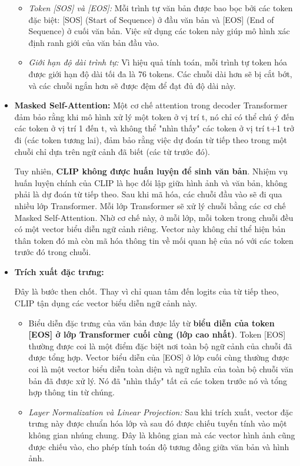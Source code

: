 \begin{itemize}
\begin{itemize}
\item \textit{Token [SOS] và [EOS]:} Mỗi trình tự văn bản được bao bọc bởi các token đặc biệt: [SOS] (Start of Sequence) ở đầu văn bản và [EOS] (End of Sequence) ở cuối văn bản. Việc sử dụng các token này giúp mô hình xác định ranh giới của văn bản đầu vào. 
\item \textit{Giới hạn độ dài trình tự:} Vì hiệu quả tính toán, mỗi trình tự token hóa được giới hạn độ dài tối đa là 76 tokens. Các chuỗi dài hơn sẽ bị cắt bớt, và các chuỗi ngắn hơn sẽ được đệm để đạt đủ độ dài này.
\end{itemize}
\item \textbf{Masked Self-Attention:} Một cơ chế attention trong decoder Transformer đảm bảo rằng khi mô hình xử lý một token ở vị trí t, nó chỉ có thể chú ý đến các token ở vị trí 1 đến t, và không thể "nhìn thấy" các token ở vị trí t+1 trở đi (các token tương lai), đảm bảo rằng việc dự đoán từ tiếp theo trong một chuỗi chỉ dựa trên ngữ cảnh đã biết (các từ trước đó). 

Tuy nhiên, \textbf{CLIP không được huấn luyện để sinh văn bản}. Nhiệm vụ huấn luyện chính của CLIP là học đối lập giữa hình ảnh và văn bản, không phải là dự đoán từ tiếp theo. Sau khi mã hóa, các chuỗi đầu vào sẽ đi qua nhiều lớp Transformer. Mỗi lớp Transformer sẽ xử lý chuỗi bằng các cơ chế Masked Self-Attention. Nhờ cơ chế này, ở mỗi lớp, mỗi token trong chuỗi đều có một vector biểu diễn ngữ cảnh riêng. Vector này không chỉ thể hiện bản thân token đó mà còn mã hóa thông tin về mối quan hệ của nó với các token trước đó trong chuỗi.

\item \textbf{Trích xuất đặc trưng:}

Đây là bước then chốt. Thay vì chỉ quan tâm đến logits của từ tiếp theo, CLIP tận dụng các vector biểu diễn ngữ cảnh này.
\begin{itemize}
\item Biểu diễn đặc trưng của văn bản được lấy từ \textbf{biểu diễn của token [EOS] ở lớp Transformer cuối cùng (lớp cao nhất)}. Token [EOS] thường được coi là một điểm đặc biệt nơi toàn bộ ngữ cảnh của chuỗi đã được tổng hợp. Vector biểu diễn của [EOS] ở lớp cuối cùng thường được coi là một vector biểu diễn toàn diện và ngữ nghĩa của toàn bộ chuỗi văn bản đã được xử lý. Nó đã "nhìn thấy" tất cả các token trước nó và tổng hợp thông tin từ chúng.
\item \textit{Layer Normalization và Linear Projection:} Sau khi trích xuất, vector đặc trưng này được chuẩn hóa lớp và sau đó được chiếu tuyến tính vào một không gian nhúng chung. Đây là không gian mà các vector hình ảnh cũng được chiếu vào, cho phép tính toán độ tương đồng giữa văn bản và hình ảnh.
\end{itemize}
\end{itemize}

